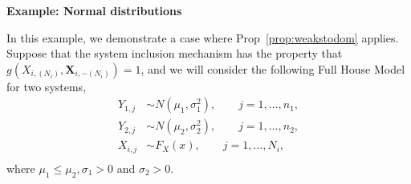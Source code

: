 \documentclass[12pt]{article}
\DeclareMathOperator*{\Prob}{P}
\begin{document}


\noindent\textbf{Example: Normal distributions}

In this example, we demonstrate a case where Prop~\ref{prop:weakstodom} applies. Suppose that the system inclusion mechanism has the property that $g(X_{i,(N_i)}, \textbf{X}_{i,-(N_i)}) = 1$, and we will consider the following Full House Model for two systems,
\begin{align*}
  Y_{1,j} &\sim N(\mu_1,\sigma_1^2), \qquad j = 1,\ldots,n_1, \\
  Y_{2,j} &\sim N(\mu_2,\sigma_2^2), \qquad j = 1,\ldots,n_2, \\
  X_{i,j} &\sim F_X(x), \qquad j = 1,\ldots,N_i, \\
\end{align*} 
where $\mu_1 \leq \mu_2, \sigma_1 > 0$ and $\sigma_2 >0$. 
\end{document}
